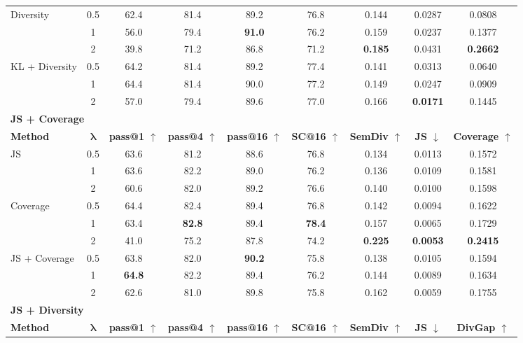 \documentclass{article} %
\begin{document}
\begin{table}[!htbp]
{\begin{tabular}{lc|ccccc|cc}
\cmidrule(lr){1-9}

\multirow{3}{*}{Diversity}
& 0.5
& 62.4 & 81.4 & 89.2 & 76.8 & 0.144
& 0.0287 & 0.0808 \\
& 1
& 56.0 & 79.4 & \textbf{91.0} & 76.2 & 0.159
& 0.0237 & 0.1377 \\
& 2
& 39.8 & 71.2 & 86.8 & 71.2 & \textbf{0.185}
& 0.0431 & \textbf{0.2662} \\

\cmidrule(lr){1-9}

\multirow{3}{*}{KL + Diversity}
& 0.5
& 64.2 & 81.4 & 89.2 & 77.4 & 0.141
& 0.0313 & 0.0640 \\
& 1
& 64.4 & 81.4 & 90.0 & 77.2 & 0.149
& 0.0247 & 0.0909 \\
& 2
& 57.0 & 79.4 & 89.6 & 77.0 & 0.166
& \textbf{0.0171} & 0.1445 \\
\midrule
\multicolumn{9}{l}{\textbf{JS + Coverage}} \\
\cmidrule(lr){1-9}
\textbf{Method}
& $\boldsymbol{\lambda}$
& \textbf{pass@1 $\uparrow$}
& \textbf{pass@4 $\uparrow$}
& \textbf{pass@16 $\uparrow$}
& \textbf{SC@16 $\uparrow$}
& \textbf{SemDiv $\uparrow$}
& \textbf{JS $\downarrow$}
& \textbf{Coverage $\uparrow$} \\
\midrule

\multirow{3}{*}{JS}
& 0.5
& 63.6 & 81.2 & 88.6 & 76.8 & 0.134
& 0.0113 & 0.1572 \\
& 1
& 63.6 & 82.2 & 89.0 & 76.2 & 0.136
& 0.0109 & 0.1581 \\
& 2
& 60.6 & 82.0 & 89.2 & 76.6 & 0.140
& 0.0100 & 0.1598 \\

\cmidrule(lr){1-9}

\multirow{3}{*}{Coverage}
& 0.5
& 64.4 & 82.4 & 89.4 & 76.8 & 0.142
& 0.0094 & 0.1622 \\
& 1
& 63.4 & \textbf{82.8} & 89.4 & \textbf{78.4} & 0.157
& 0.0065 & 0.1729 \\
& 2
& 41.0 & 75.2 & 87.8 & 74.2 & \textbf{0.225}
& \textbf{0.0053} & \textbf{0.2415} \\

\cmidrule(lr){1-9}

\multirow{3}{*}{JS + Coverage}
& 0.5
& 63.8 & 82.0 & \textbf{90.2} & 75.8 & 0.138
& 0.0105 & 0.1594 \\
& 1
& \textbf{64.8} & 82.2 & 89.4 & 76.2 & 0.144
& 0.0089 & 0.1634 \\
& 2
& 62.6 & 81.0 & 89.8 & 75.8 & 0.162
& 0.0059 & 0.1755 \\
\midrule
\multicolumn{9}{l}{\textbf{JS + Diversity}} \\
\cmidrule(lr){1-9}
\textbf{Method}
& $\boldsymbol{\lambda}$
& \textbf{pass@1 $\uparrow$}
& \textbf{pass@4 $\uparrow$}
& \textbf{pass@16 $\uparrow$}
& \textbf{SC@16 $\uparrow$}
& \textbf{SemDiv $\uparrow$}
& \textbf{JS $\downarrow$}
& \textbf{DivGap $\uparrow$} \\
\midrule


\end{tabular}}
\end{table}
\end{document}
